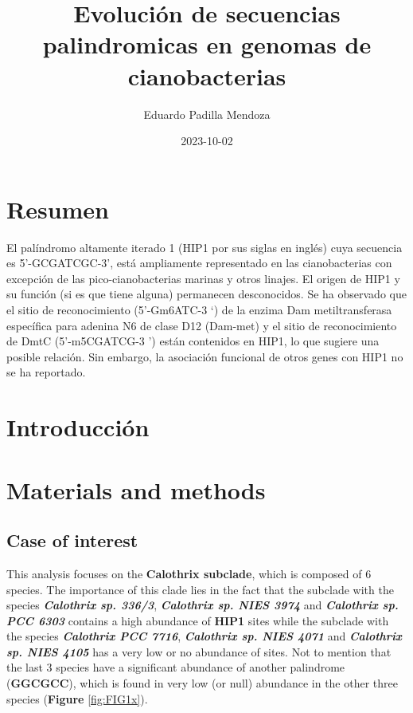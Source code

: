 \documentclass[
]{book}
\title{Evolución de secuencias palindromicas en genomas de cianobacterias}
\author{Eduardo Padilla Mendoza}
\date{2023-10-02}
\begin{document}
\maketitle

{
\setcounter{tocdepth}{1}
\tableofcontents
}
\hypertarget{resumen}{%
\chapter*{Resumen}\label{resumen}}

El palíndromo altamente iterado 1 (HIP1 por sus siglas en inglés) cuya secuencia es 5'-GCGATCGC-3', está ampliamente representado en las cianobacterias con excepción de las pico-cianobacterias marinas y otros linajes. El origen de HIP1 y su función (si es que tiene alguna) permanecen desconocidos. Se ha observado que el sitio de reconocimiento (5'-Gm6ATC-3 `) de la enzima Dam metiltransferasa específica para adenina N6 de clase D12 (Dam-met) y el sitio de reconocimiento de DmtC (5'-m5CGATCG-3 ') están contenidos en HIP1, lo que sugiere una posible relación. Sin embargo, la asociación funcional de otros genes con HIP1 no se ha reportado.

\hypertarget{introducciuxf3n}{%
\chapter{Introducción}\label{introducciuxf3n}}

\hypertarget{materials-and-methods}{%
\chapter{Materials and methods}\label{materials-and-methods}}

\hypertarget{case-of-interest}{%
\section{Case of interest}\label{case-of-interest}}

This analysis focuses on the \textbf{Calothrix subclade}, which is composed of 6 species. The importance of this clade lies in the fact that the subclade with the species \textbf{\emph{Calothrix sp. 336/3}}, \textbf{\emph{Calothrix sp. NIES 3974}} and \textbf{\emph{Calothrix sp. PCC 6303}} contains a high abundance of \textbf{HIP1} sites while the subclade with the species \textbf{\emph{Calothrix PCC 7716}}, \textbf{\emph{Calothrix sp. NIES 4071}} and \textbf{\emph{Calothrix sp. NIES 4105}} has a very low or no abundance of sites. Not to mention that the last 3 species have a significant abundance of another palindrome (\textbf{GGCGCC}), which is found in very low (or null) abundance in the other three species (\textbf{Figure} \ref{fig:FIG1x}).
\end{document}
